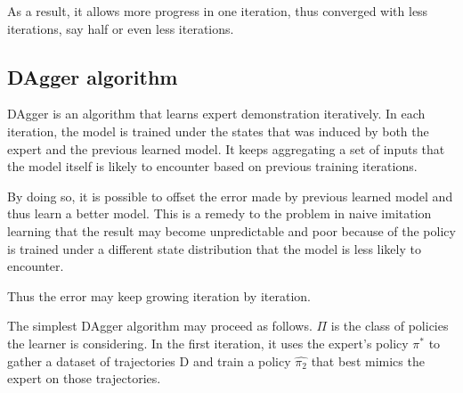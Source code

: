 \documentclass[twoside]{article}
\begin{document}
As a result, it allows more progress in one iteration, thus converged with less iterations, say half or even less iterations.  








\subsection{DAgger algorithm}
DAgger is an algorithm that learns expert demonstration iteratively. In each iteration, the model is trained under the states that was induced by both the expert and the previous learned model. It keeps aggregating a set of inputs that the model itself is likely to encounter based on previous training iterations.  

By doing so, it is possible to offset the error made by previous learned model and thus learn a better model. This is a remedy to the problem in naive imitation learning that the result may become unpredictable and poor because of the policy is trained under a different state distribution
that the model is less likely to encounter. 


Thus the error may keep growing iteration by iteration.

The simplest DAgger algorithm may proceed as follows.
$\Pi$ is the class of policies the learner is considering.
In the first iteration, it uses the expert’s policy $\pi^*$ to gather
a dataset of trajectories D and train a policy $\hat{\pi_2}$ that best mimics the expert on those trajectories. 
\end{document}
